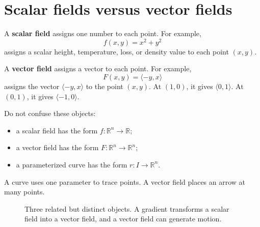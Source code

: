 \documentclass[11pt]{article}
\newcommand{\R}{\mathbb R}
\begin{document}
\section{Scalar fields versus vector fields}

A \textbf{scalar field} assigns one number to each point. For example,
\[
f(x,y)=x^2+y^2
\]
assigns a scalar height, temperature, loss, or density value to each point $(x,y)$.

A \textbf{vector field} assigns a vector to each point. For example,
\[
F(x,y)=\langle -y,x\rangle
\]
assigns the vector $\langle -y,x\rangle$ to the point $(x,y)$. At $(1,0)$, it gives $\langle 0,1\rangle$. At $(0,1)$, it gives $\langle -1,0\rangle$.

\begin{importantbox}
Do not confuse these objects:
\begin{itemize}
  \item a scalar field has the form $f:\R^n\to\R$;
  \item a vector field has the form $F:\R^n\to\R^n$;
  \item a parameterized curve has the form $r:I\to\R^n$.
\end{itemize}
A curve uses one parameter to trace points. A vector field places an arrow at many points.
\end{importantbox}

\begin{figure}[H]
\centering
{}
\caption{Three related but distinct objects. A gradient transforms a scalar field into a vector field, and a vector field can generate motion.}
\end{figure}
\end{document}
